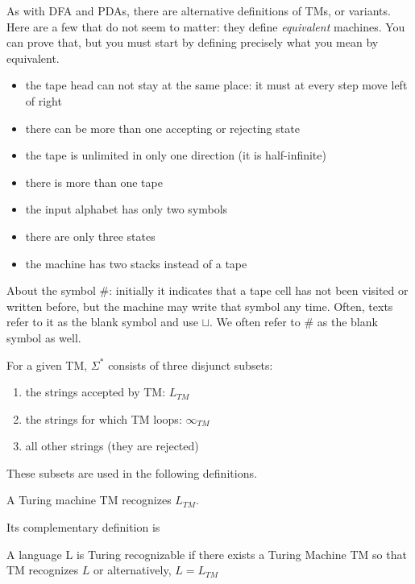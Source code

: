As with DFA and PDAs, there are alternative definitions of TMs, or
variants. Here are a few that do not seem to matter: they define {\em
  equivalent} machines. You can prove that, but you must start by
defining precisely what you mean by equivalent.

\begin{itemize}
\item the tape head can not stay at the same place: it must at every step move left of right
\item there can be more than one accepting or rejecting state
\item the tape is unlimited in only one direction (it is half-infinite)
\item there is more than one tape
\item the input alphabet has only two symbols\label{twosymbols}
\item there are only three states
\item the machine has two stacks instead of a tape
\end{itemize}

About the symbol \#: initially it indicates that a tape cell has not
been visited or written before, but the machine may write that symbol
any time. Often, texts refer to it as the blank symbol and use
$\sqcup$. We often refer to \# as the blank symbol as well.


For a given TM, $\Sigma^*$ consists of three disjunct subsets:
\begin{enumerate}
\item the strings accepted by TM: $L_{TM}$
\item the strings for which TM loops: $\infty_{TM}$
\item all other strings (they are rejected)
\end{enumerate}
These subsets are used in the following definitions.


\begin{definition}[To recognize]
A Turing machine TM recognizes $L_{TM}$.
\end{definition}

Its complementary definition is

\begin{definition}
A language L is Turing recognizable if there exists a Turing Machine
TM so that TM recognizes $L$ or alternatively, $L = L_{TM}$
\end{definition}

